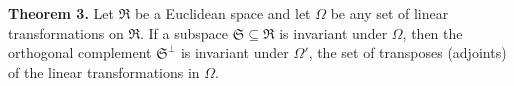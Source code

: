 \textbf{Theorem 3.} Let $\Re$ be a Euclidean space and let $\Omega$ be any set of linear transformations on $\Re$. If a subspace $\mathfrak{S} \subseteq \Re$ is invariant under $\Omega$, then the orthogonal complement $\mathfrak{S}^\perp$ is invariant under $\Omega'$, the set of transposes (adjoints) of the linear transformations in $\Omega$.
